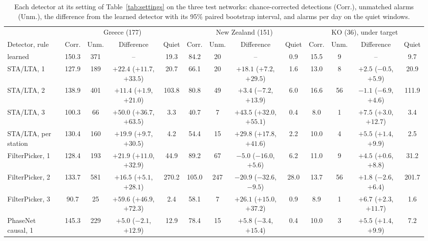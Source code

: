 \documentclass[a4paper,fleqn]{cas-sc}
\newcommand{\stalta}{STA/LTA}
\begin{document}
\begin{table}[pos=htbp]
  \centering\scriptsize
  \caption{Each detector at its setting of Table~\ref{tab:settings} on the three test networks: chance-corrected
    detections (Corr.), unmatched alarms (Unm.), the difference from the learned detector
  with its 95\% paired bootstrap interval, and alarms per day on the quiet windows.}\label{tab:results}
  \setlength{\tabcolsep}{2.2pt}
  \begin{tabular}{@{}lcccccccccccc@{}}
    \toprule
    & \multicolumn{4}{c}{Greece (177)} & \multicolumn{4}{c}{New Zealand (151)} & \multicolumn{4}{c}{KO (36), under target} \\
    \cmidrule(lr){2-5}\cmidrule(lr){6-9}\cmidrule(lr){10-13}
    Detector, rule & Corr. & Unm. & Difference & Quiet & Corr. & Unm. & Difference & Quiet & Corr. & Unm. & Difference & Quiet \\
    \midrule
    learned & 150.3 & 371 & -- & 19.3 & 84.2 & 20 & -- & 0.9 & 15.5 & 9 & -- & 9.7 \\
    \stalta{}, 1 & 127.9 & 189 & $+22.4$ ($+11.7$, $+33.5$) & 20.7 & 66.1 & 20 & $+18.1$ ($+7.2$, $+29.5$) & 1.6 & 13.0 & 8 & $+2.5$ ($-0.5$, $+5.9$) & 20.9 \\
    \stalta{}, 2 & 138.9 & 401 & $+11.4$ ($+1.9$, $+21.0$) & 103.8 & 80.8 & 49 & $+3.4$ ($-7.2$, $+13.9$) & 6.0 & 16.6 & 56 & $-1.1$ ($-6.9$, $+4.6$) & 111.9 \\
    \stalta{}, 3 & 100.3 & 66 & $+50.0$ ($+36.7$, $+63.5$) & 3.3 & 40.7 & 7 & $+43.5$ ($+32.0$, $+55.1$) & 0.4 & 8.0 & 1 & $+7.5$ ($+3.0$, $+12.7$) & 3.4 \\
    \stalta{}, per station & 130.4 & 160 & $+19.9$ ($+9.7$, $+30.5$) & 4.2 & 54.4 & 15 & $+29.8$ ($+17.8$, $+41.6$) & 2.2 & 10.0 & 4 & $+5.5$ ($+1.4$, $+9.9$) & 2.5 \\
    FilterPicker, 1 & 128.4 & 193 & $+21.9$ ($+11.0$, $+32.9$) & 44.9 & 89.2 & 67 & $-5.0$ ($-16.0$, $+5.6$) & 6.2 & 11.0 & 9 & $+4.5$ ($+0.6$, $+8.8$) & 31.2 \\
    FilterPicker, 2 & 133.7 & 581 & $+16.5$ ($+5.1$, $+28.1$) & 270.2 & 105.0 & 247 & $-20.9$ ($-32.6$, $-9.5$) & 28.0 & 13.7 & 56 & $+1.8$ ($-2.6$, $+6.4$) & 201.7 \\
    FilterPicker, 3 & 90.7 & 25 & $+59.6$ ($+46.9$, $+72.3$) & 2.4 & 58.1 & 7 & $+26.1$ ($+15.0$, $+37.2$) & 0.9 & 8.9 & 1 & $+6.7$ ($+2.3$, $+11.7$) & 1.6 \\
    PhaseNet causal, 1 & 145.3 & 229 & $+5.0$ ($-2.1$, $+12.9$) & 12.9 & 78.4 & 15 & $+5.8$ ($-3.4$, $+15.4$) & 0.4 & 10.0 & 3 & $+5.5$ ($+1.4$, $+9.9$) & 7.2 \\

\end{tabular}
\end{table}
\end{document}
